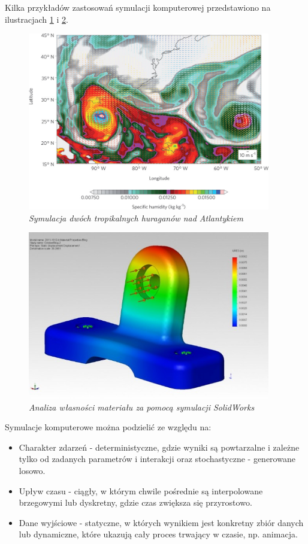 \documentclass[12pt, oneside]{report}
\theoremstyle{definition}
\begin{document}
\newpage
Kilka przykładów zastosowań symulacji komputerowej przedstawiono na ilustracjach \ref{MeteorologySimulationImage} i \ref{EngineeringSimulationImage}.

\begin{figure}[H]
	\centering
		\includegraphics[width = 300pt]{MeteorologySimulation} 
		\caption{\textit{Symulacja dwóch tropikalnych huraganów nad Atlantykiem \cite{MeteorologySimulation}}}
\label{MeteorologySimulationImage}
\end{figure}

\begin{figure}[H]
	\centering
		\includegraphics[width = 300pt]{EngineeringSimulation} 
		\caption{\textit{Analiza własności materiału za pomocą symulacji SolidWorks \cite{EngineeringSimulation}}}
\label{EngineeringSimulationImage}
\end{figure}

\newpage
Symulacje komputerowe można podzielić ze względu na:
\begin{itemize}
\item Charakter zdarzeń - deterministyczne, gdzie wyniki są powtarzalne i zależne tylko od zadanych parametrów i interakcji oraz stochastyczne - generowane losowo. 
\item Upływ czasu - ciągły, w którym chwile pośrednie są interpolowane brzegowymi lub dyskretny, gdzie czas zwiększa się przyrostowo.
\item Dane wyjściowe - statyczne, w których wynikiem jest konkretny zbiór danych lub dynamiczne, które ukazują cały proces trwający w czasie, np. animacja.
\end{itemize}
\end{document}
